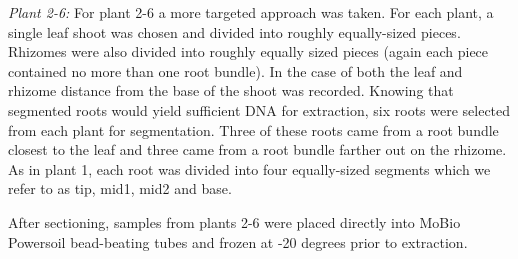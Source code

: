 \textit{Plant 2-6:} For plant 2-6 a more targeted approach was taken. For each plant, a single leaf shoot was chosen and divided into roughly equally-sized pieces. Rhizomes were also divided into roughly equally sized pieces (again each piece contained no more than one root bundle). In the case of both the leaf and rhizome distance from the base of the shoot was recorded. Knowing that segmented roots would yield sufficient DNA for extraction, six roots were selected from each plant for segmentation. Three of these roots came from a root bundle closest to the leaf and three came from a root bundle farther out on the rhizome. As in plant 1, each root was divided into four equally-sized segments which we refer to as tip, mid1, mid2 and base.

After sectioning, samples from plants 2-6 were placed directly into MoBio Powersoil bead-beating tubes and frozen at -20 degrees prior to extraction.
    
    